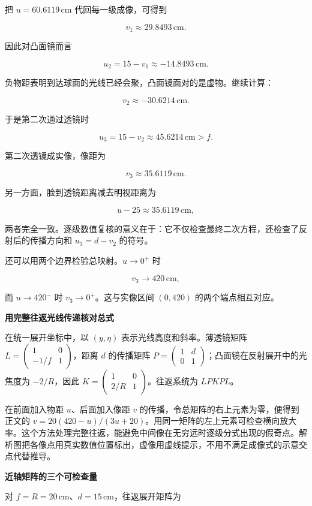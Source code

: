 \documentclass[12pt,a4paper,UTF8]{ctexart}
\begin{document}
把 \(u=60.6119\,\mathrm{cm}\) 代回每一级成像，可得到

\[
v_1\approx29.8493\,\mathrm{cm}.
\]

因此对凸面镜而言

\[
u_2=15-v_1\approx-14.8493\,\mathrm{cm}.
\]

负物距表明到达球面的光线已经会聚，凸面镜面对的是虚物。继续计算：

\[
v_2\approx-30.6214\,\mathrm{cm}.
\]

于是第二次通过透镜时

\[
u_3=15-v_2\approx45.6214\,\mathrm{cm}>f.
\]

第二次透镜成实像，像距为

\[
v_3\approx35.6119\,\mathrm{cm}.
\]

另一方面，脸到透镜距离减去明视距离为

\[
u-25\approx35.6119\,\mathrm{cm},
\]

两者完全一致。逐级数值复核的意义在于：它不仅检查最终二次方程，还检查了反射后的传播方向和
\(u_3=d-v_2\) 的符号。

还可以用两个边界检验总映射。\(u\to0^+\) 时

\[
v_3\to420\,\mathrm{cm},
\]

而 \(u\to420^-\) 时 \(v_3\to0^+\)。这与实像区间 \((0,420)\)
的两个端点相互对应。

\textbf{用完整往返光线传递核对总式}

在统一展开坐标中，以 \((y,\eta)\) 表示光线高度和斜率。薄透镜矩阵
\(L=\begin{pmatrix}1&0\\-1/f&1\end{pmatrix}\)，距离 \(d\) 的传播矩阵
\(P=\begin{pmatrix}1&d\\0&1\end{pmatrix}\)；凸面镜在反射展开中的光焦度为
\(-2/R\)，因此 \(K=\begin{pmatrix}1&0\\2/R&1\end{pmatrix}\)。往返系统为
\(L P K P L\)。

在前面加入物距 \(u\)、后面加入像距 \(v\)
的传播，令总矩阵的右上元素为零，便得到正文的
\(v=20(420-u)/(3u+20)\)。用同一矩阵的左上元素可检查横向放大率。这个方法处理完整往返，能避免中间像在无穷远时逐级分式出现的假奇点。解析图把各像点用真实数值位置标出，虚像用虚线提示，不用不满足成像式的示意交点代替推导。

\textbf{近轴矩阵的三个可检查量}

对 \(f=R=20\,\mathrm{cm}\)、\(d=15\,\mathrm{cm}\)，往返展开矩阵为
\end{document}
